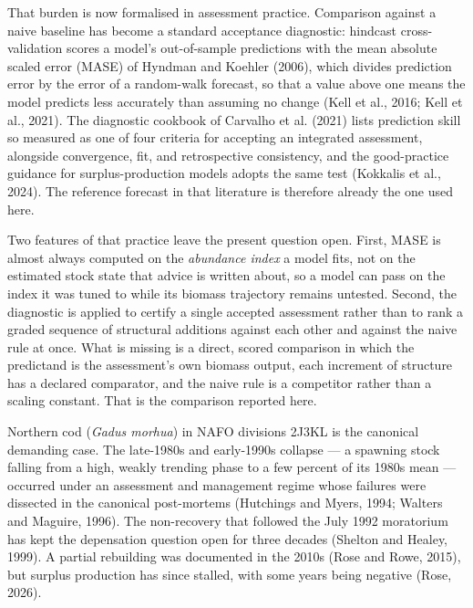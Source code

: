 \documentclass[11pt]{article}
\begin{document}
That burden is now formalised in assessment practice. Comparison against
a naive baseline has become a standard acceptance diagnostic: hindcast
cross-validation scores a model's out-of-sample predictions with the
mean absolute scaled error (MASE) of Hyndman and Koehler (2006), which
divides prediction error by the error of a random-walk forecast, so that
a value above one means the model predicts less accurately than assuming
no change (Kell et al., 2016; Kell et al., 2021). The diagnostic
cookbook of Carvalho et al. (2021) lists prediction skill so measured as
one of four criteria for accepting an integrated assessment, alongside
convergence, fit, and retrospective consistency, and the good-practice
guidance for surplus-production models adopts the same test (Kokkalis
et al., 2024). The reference forecast in that literature is therefore
already the one used here.

Two features of that practice leave the present question open. First,
MASE is almost always computed on the \emph{abundance index} a model
fits, not on the estimated stock state that advice is written about, so
a model can pass on the index it was tuned to while its biomass
trajectory remains untested. Second, the diagnostic is applied to
certify a single accepted assessment rather than to rank a graded
sequence of structural additions against each other and against the
naive rule at once. What is missing is a direct, scored comparison in
which the predictand is the assessment's own biomass output, each
increment of structure has a declared comparator, and the naive rule is
a competitor rather than a scaling constant. That is the comparison
reported here.

Northern cod (\emph{Gadus morhua}) in NAFO divisions 2J3KL is the
canonical demanding case. The late-1980s and early-1990s collapse --- a
spawning stock falling from a high, weakly trending phase to a few
percent of its 1980s mean --- occurred under an assessment and
management regime whose failures were dissected in the canonical
post-mortems (Hutchings and Myers, 1994; Walters and Maguire, 1996). The
non-recovery that followed the July 1992 moratorium has kept the
depensation question open for three decades (Shelton and Healey, 1999).
A partial rebuilding was documented in the 2010s (Rose and Rowe, 2015),
but surplus production has since stalled, with some years being negative
(Rose, 2026).
\end{document}
